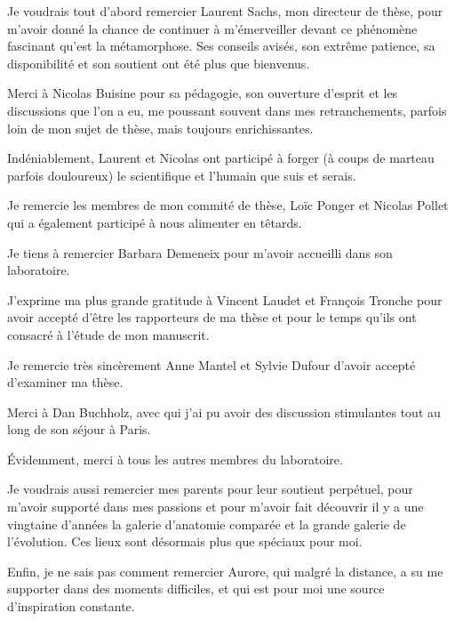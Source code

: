 \documentclass[../main.tex]{subfiles}
\begin{document}
Je voudrais tout d'abord remercier Laurent Sachs, mon directeur de thèse, pour m'avoir donné la chance de continuer à m’émerveiller devant ce phénomène fascinant qu'est la métamorphose. Ses conseils avisés, son extrême patience, sa disponibilité et son soutient ont été plus que bienvenus.
\par
Merci à Nicolas Buisine pour sa pédagogie, son ouverture d'esprit et les discussions que l'on a eu, me poussant souvent dans mes retranchements, parfois loin de mon sujet de thèse, mais toujours enrichissantes.
\par
Indéniablement, Laurent et Nicolas ont participé à forger (à coups de marteau parfois douloureux) le scientifique et l'humain que suis et serais.
\par
Je remercie les membres de mon commité de thèse, Loïc Ponger et Nicolas Pollet qui a également participé à nous alimenter en têtards.
\par
Je tiens à remercier Barbara Demeneix pour m'avoir accueilli dans son laboratoire.
\par
J'exprime ma plus grande gratitude à Vincent Laudet et François Tronche pour avoir accepté d'être les rapporteurs de ma thèse et pour le temps qu'ils ont consacré à l'étude de mon manuscrit.
\par
Je remercie très sincèrement Anne Mantel et Sylvie Dufour d'avoir accepté d’examiner ma thèse.
\par
Merci à Dan Buchholz, avec qui j'ai pu avoir des discussion stimulantes tout au long de son séjour à Paris.
\par
Évidemment, merci à tous les autres membres du laboratoire.
\par
Je voudrais aussi remercier mes parents pour leur soutient perpétuel, pour m'avoir supporté dans mes passions et pour m'avoir fait découvrir il y a une vingtaine d'années la galerie d'anatomie comparée et la grande galerie de l'évolution.
Ces lieux sont désormais plus que spéciaux pour moi.
\par
Enfin, je ne sais pas comment remercier Aurore, qui malgré la distance, a su me supporter dans des moments difficiles, et qui est pour moi une source d'inspiration constante.
\end{document}
